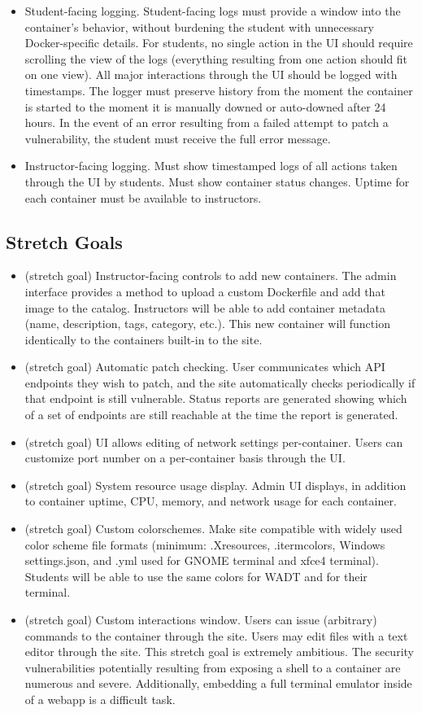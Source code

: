\documentclass[12pt]{article}
\begin{document}
\begin{itemize}
	\item Student-facing logging. Student-facing logs must provide a window into the container's behavior, without burdening the student with unnecessary Docker-specific details. For students, no single action in the UI should require scrolling the view of the logs (everything resulting from one action should fit on one view). All major interactions through the UI should be logged with timestamps. The logger must preserve history from the moment the container is started to the moment it is manually downed or auto-downed after 24 hours. In the event of an error resulting from a failed attempt to patch a vulnerability, the student must receive the full error message.
	\item Instructor-facing logging. Must show timestamped logs of all actions taken through the UI by students. Must show container status changes. Uptime for each container must be available to instructors.
\end{itemize}

\subsection{Stretch Goals}
\begin{itemize}
	\item (stretch goal) Instructor-facing controls to add new containers. The admin interface provides a method to upload a custom Dockerfile and add that image to the catalog. Instructors will be able to add container metadata (name, description, tags, category, etc.). This new container will function identically to the containers built-in to the site.
	\item (stretch goal) Automatic patch checking. User communicates which API endpoints they wish to patch, and the site automatically checks periodically if that endpoint is still vulnerable. Status reports are generated showing which of a set of endpoints are still reachable at the time the report is generated.
	\item (stretch goal) UI allows editing of network settings per-container. Users can customize port number on a per-container basis through the UI.
	\item (stretch goal) System resource usage display. Admin UI displays, in addition to container uptime, CPU, memory, and network usage for each container.
	\item (stretch goal) Custom colorschemes.
	      Make site compatible with widely used color scheme file formats (minimum: .Xresources, .itermcolors, Windows settings.json, and .yml used for GNOME terminal and xfce4 terminal). Students will be able to use the same colors for WADT and for their terminal.
	\item (stretch goal) Custom interactions window. Users can issue (arbitrary) commands to the container through the site. Users may edit files with a text editor through the site. This stretch goal is extremely ambitious. The security vulnerabilities potentially resulting from exposing a shell to a container are numerous and severe. Additionally, embedding a full terminal emulator inside of a webapp is a difficult task.
\end{itemize}
\end{document}
